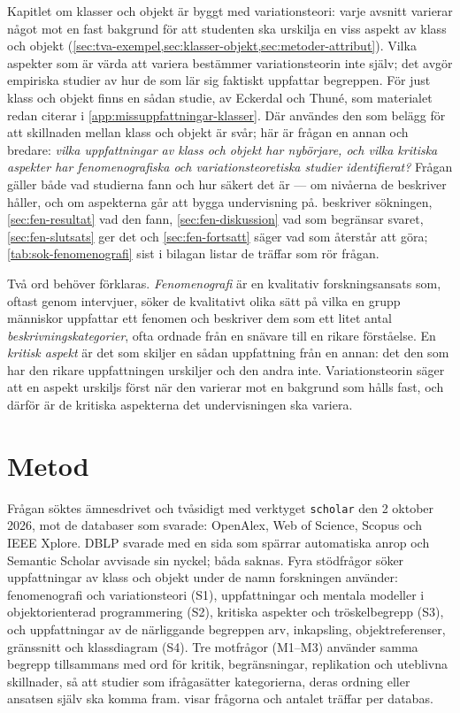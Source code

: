 Kapitlet om klasser och objekt är byggt med variationsteori: varje
avsnitt varierar något mot en fast bakgrund för att studenten ska urskilja
en viss aspekt av klass och objekt
(\cref{sec:tva-exempel,sec:klasser-objekt,sec:metoder-attribut}).  Vilka
aspekter som är värda att variera bestämmer variationsteorin inte själv;
det avgör empiriska studier av hur de som lär sig faktiskt uppfattar
begreppen.  För just klass och objekt finns en sådan studie, av Eckerdal
och Thuné\autocite{EckerdalThune2005}, som materialet redan citerar i
\cref{app:missuppfattningar-klasser}.  Där användes den som belägg för
att skillnaden mellan klass och objekt är svår; här är frågan en annan
och bredare: \emph{vilka uppfattningar av klass och objekt har
nybörjare, och vilka kritiska aspekter har fenomenografiska och
variationsteoretiska studier identifierat?}  Frågan gäller både vad
studierna fann och hur säkert det är --- om nivåerna de beskriver håller,
och om aspekterna går att bygga undervisning på.
 beskriver sökningen, \cref{sec:fen-resultat} vad den
fann, \cref{sec:fen-diskussion} vad som begränsar svaret,
\cref{sec:fen-slutsats} ger det och \cref{sec:fen-fortsatt} säger vad som
återstår att göra; \cref{tab:sok-fenomenografi} sist i bilagan listar de
träffar som rör frågan.

Två ord behöver förklaras.  \emph{Fenomenografi} är en kvalitativ
forskningsansats som, oftast genom intervjuer, söker de kvalitativt olika
sätt på vilka en grupp människor uppfattar ett fenomen och beskriver dem
som ett litet antal \emph{beskrivningskategorier}, ofta ordnade från
en snävare till en rikare förståelse.  En \emph{kritisk aspekt} är det
som skiljer en sådan uppfattning från en annan: det den som har den
rikare uppfattningen urskiljer och den andra inte.  Variationsteorin
säger att en aspekt urskiljs först när den varierar mot en bakgrund som
hålls fast\autocite{MartonPang2006}, och därför är de kritiska aspekterna
det undervisningen ska variera.

\section{Metod}
\label{sec:fen-metod}

Frågan söktes ämnesdrivet och tvåsidigt med verktyget \texttt{scholar}
den 2 oktober 2026, mot de databaser som svarade: OpenAlex, Web of Science,
Scopus och IEEE Xplore.  DBLP svarade med en sida som spärrar automatiska
anrop och Semantic Scholar avvisade sin nyckel; båda saknas.  Fyra
stödfrågor söker uppfattningar av klass och objekt under de namn
forskningen använder: fenomenografi och variationsteori (S1),
uppfattningar och mentala modeller i objektorienterad programmering
(S2), kritiska aspekter och tröskelbegrepp (S3), och uppfattningar av de
närliggande begreppen arv, inkapsling, objektreferenser, gränssnitt och
klassdiagram (S4).  Tre motfrågor (M1--M3) använder samma begrepp
tillsammans med ord för kritik, begränsningar, replikation och uteblivna
skillnader, så att studier som ifrågasätter kategorierna, deras ordning
eller ansatsen själv ska komma fram.   visar
frågorna och antalet träffar per databas.

